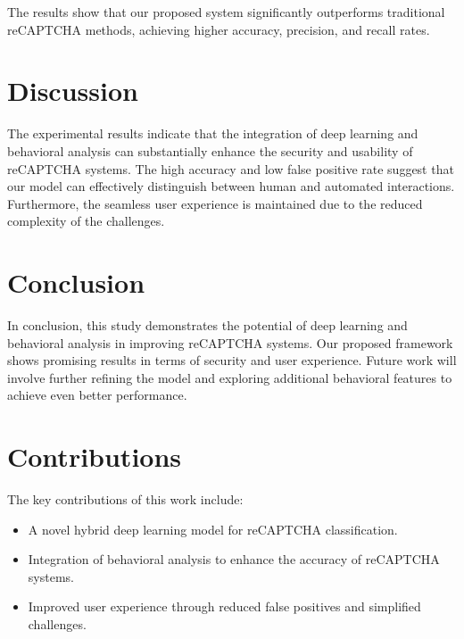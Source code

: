 \documentclass{article}
\begin{document}
The results show that our proposed system significantly outperforms traditional reCAPTCHA methods, achieving higher accuracy, precision, and recall rates.

\section{Discussion}
\label{sec:discussion}

The experimental results indicate that the integration of deep learning and behavioral analysis can substantially enhance the security and usability of reCAPTCHA systems. The high accuracy and low false positive rate suggest that our model can effectively distinguish between human and automated interactions. Furthermore, the seamless user experience is maintained due to the reduced complexity of the challenges.

\section{Conclusion}
\label{sec:conclusion}

In conclusion, this study demonstrates the potential of deep learning and behavioral analysis in improving reCAPTCHA systems. Our proposed framework shows promising results in terms of security and user experience. Future work will involve further refining the model and exploring additional behavioral features to achieve even better performance.

\section{Contributions}
\label{sec:contributions}

The key contributions of this work include:
\begin{itemize}
    \item A novel hybrid deep learning model for reCAPTCHA classification.
    \item Integration of behavioral analysis to enhance the accuracy of reCAPTCHA systems.
    \item Improved user experience through reduced false positives and simplified challenges.
\end{itemize}



\end{document}
